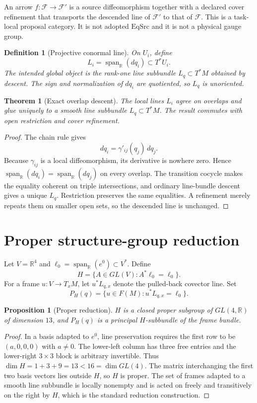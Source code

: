 \documentclass[11pt]{article}
\newtheorem{theorem}{Theorem}
\newtheorem{proposition}{Proposition}
\newtheorem{definition}{Definition}
\newcommand{\Span}{\operatorname{span}_{\mathbb R}}
\begin{document}
An arrow $f:\mathcal F\to\mathcal F'$ is a source diffeomorphism together
with a declared cover refinement that transports the descended line of
$\mathcal F'$ to that of $\mathcal F$.  This is a task-local proposal
category.  It is not adopted $\mathrm{EqSrc}$ and it is not a physical gauge
group.

\begin{definition}[Projective conormal line]
On $U_i$, define
\[
 L_i=\Span(dq_i)\subset T^*U_i.
\]
The intended global object is the rank-one line subbundle $L_q\subset T^*M$
obtained by descent.  The sign and normalization of $dq_i$ are quotiented, so
$L_q$ is unoriented.
\end{definition}

\begin{theorem}[Exact overlap descent]
The local lines $L_i$ agree on overlaps and glue uniquely to a smooth line
subbundle $L_q\subset T^*M$.  The result commutes with open restriction and
cover refinement.
\end{theorem}

\begin{proof}
The chain rule gives
\[
 dq_i=\gamma'_{ij}(q_j)\,dq_j.
\]
Because $\gamma_{ij}$ is a local diffeomorphism, its derivative is nowhere
zero.  Hence $\Span(dq_i)=\Span(dq_j)$ on every overlap.  The transition
cocycle makes the equality coherent on triple intersections, and ordinary
line-bundle descent gives a unique $L_q$.  Restriction preserves the same
equalities.  A refinement merely repeats them on smaller open sets, so the
descended line is unchanged.
\end{proof}

\section{Proper structure-group reduction}

Let $V=\mathbb R^4$ and $\ell_0=\Span(e^0)\subset V^*$.  Define
\[
 H=\{A\in GL(V):A^*\ell_0=\ell_0\}.
\]
For a frame $u:V\to T_xM$, let $u^*L_{q,x}$ denote the pulled-back covector
line.  Set
\[
 P_H(q)=\{u\in F(M):u^*L_{q,x}=\ell_0\}.
\]

\begin{proposition}[Proper reduction]
$H$ is a closed proper subgroup of $GL(4,\mathbb R)$ of dimension $13$, and
$P_H(q)$ is a principal $H$-subbundle of the frame bundle.
\end{proposition}

\begin{proof}
In a basis adapted to $e^0$, line preservation requires the first row to be
$(a,0,0,0)$ with $a\ne0$.  The lower-left column has three free entries and
the lower-right $3\times3$ block is arbitrary invertible.  Thus
$\dim H=1+3+9=13<16=\dim GL(4)$.  The matrix interchanging the first two basis
vectors lies outside $H$, so $H$ is proper.  The set of frames adapted to a
smooth line subbundle is locally nonempty and is acted on freely and
transitively on the right by $H$, which is the standard reduction
construction.
\end{proof}
\end{document}
